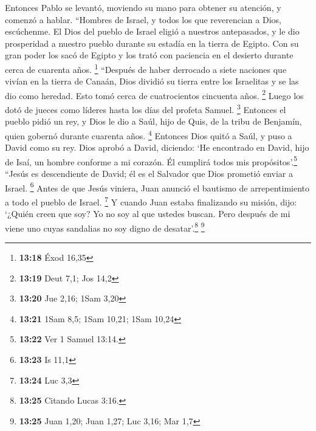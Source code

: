  Entonces Pablo se levantó, moviendo su mano para obtener
su atención, y comenzó a hablar. ``Hombres de Israel, y todos los que
reverencian a Dios, escúchenme.  El Dios del pueblo de
Israel eligió a nuestros antepasados, y le dio prosperidad a nuestro
pueblo durante su estadía en la tierra de Egipto. Con su gran poder los
sacó de Egipto  y los trató con paciencia en el desierto
durante cerca de cuarenta años. \footnote{\textbf{13:18} Éxod 16,35}
 ``Después de haber derrocado a siete naciones que vivían
en la tierra de Canaán, Dios dividió su tierra entre los Israelitas y se
las dio como heredad. Esto tomó cerca de cuatrocientos cincuenta años.
\footnote{\textbf{13:19} Deut 7,1; Jos 14,2}  Luego los
dotó de jueces como líderes hasta los días del profeta Samuel.
\footnote{\textbf{13:20} Jue 2,16; 1Sam 3,20}  Entonces
el pueblo pidió un rey, y Dios le dio a Saúl, hijo de Quis, de la tribu
de Benjamín, quien gobernó durante cuarenta años. \footnote{\textbf{13:21}
  1Sam 8,5; 1Sam 10,21; 1Sam 10,24}  Entonces Dios quitó
a Saúl, y puso a David como su rey. Dios aprobó a David, diciendo: `He
encontrado en David, hijo de Isaí, un hombre conforme a mi corazón. Él
cumplirá todos mis propósitos'.\footnote{\textbf{13:22} Ver 1 Samuel
  13:14.}  ``Jesús es descendiente de David; él es el
Salvador que Dios prometió enviar a Israel. \footnote{\textbf{13:23} Is
  11,1}  Antes de que Jesús viniera, Juan anunció el
bautismo de arrepentimiento a todo el pueblo de Israel. \footnote{\textbf{13:24}
  Luc 3,3}  Y cuando Juan estaba finalizando su misión,
dijo: `¿Quién creen que soy? Yo no soy al que ustedes buscan. Pero
después de mi viene uno cuyas sandalias no soy digno de
desatar'.\footnote{\textbf{13:25} Citando Lucas 3:16.} \footnote{\textbf{13:25}
  Juan 1,20; Juan 1,27; Luc 3,16; Mar 1,7}

